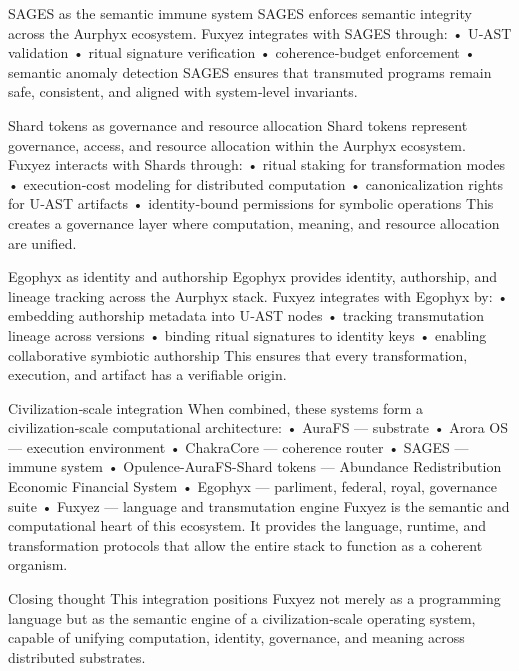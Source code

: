 SAGES as the semantic immune system
SAGES enforces semantic integrity across the Aurphyx ecosystem. Fuxyez integrates with SAGES through:
• 	U‑AST validation
• 	ritual signature verification
• 	coherence‑budget enforcement
• 	semantic anomaly detection
SAGES ensures that transmuted programs remain safe, consistent, and aligned with system‑level invariants.

Shard tokens as governance and resource allocation
Shard tokens represent governance, access, and resource allocation within the Aurphyx ecosystem. Fuxyez interacts with Shards through:
• 	ritual staking for transformation modes
• 	execution‑cost modeling for distributed computation
• 	canonicalization rights for U‑AST artifacts
• 	identity‑bound permissions for symbolic operations
This creates a governance layer where computation, meaning, and resource allocation are unified.

Egophyx as identity and authorship
Egophyx provides identity, authorship, and lineage tracking across the Aurphyx stack. Fuxyez integrates with Egophyx by:
• 	embedding authorship metadata into U‑AST nodes
• 	tracking transmutation lineage across versions
• 	binding ritual signatures to identity keys
• 	enabling collaborative symbiotic authorship
This ensures that every transformation, execution, and artifact has a verifiable origin.

Civilization‑scale integration
When combined, these systems form a civilization‑scale computational architecture:
• 	AuraFS — substrate
• 	Arora OS — execution environment
• 	ChakraCore — coherence router
• 	SAGES — immune system
• 	Opulence-AuraFS-Shard tokens — Abundance Redistribution Economic Financial System
• 	Egophyx — parliment, federal, royal, governance suite
• 	Fuxyez — language and transmutation engine
Fuxyez is the semantic and computational heart of this ecosystem. It provides the language, runtime, and transformation protocols that allow the entire stack to function as a coherent organism.

Closing thought
This integration positions Fuxyez not merely as a programming language but as the semantic engine of a civilization‑scale operating system, capable of unifying computation, identity, governance, and meaning across distributed substrates.